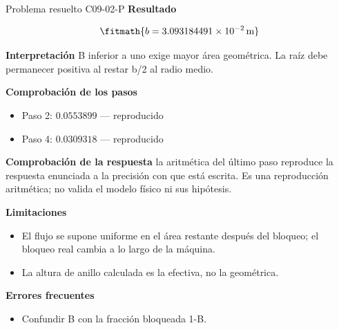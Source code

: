 \documentclass[10pt,openany]{book}
\begin{document}
\begin{studiumworked}{Problema resuelto C09-02-P}
\noindent\textbf{Resultado}

\[
\fitmath{b=3.093184491\times10^{-2}\,\mathrm{m}}
\]

\noindent\textbf{Interpretación}
B inferior a uno exige mayor área geométrica. La raíz debe permanecer positiva al restar b/2 al radio medio.

\noindent\textbf{Comprobación de los pasos}
\begin{itemize}
\item Paso 2: $0.0553899$ — reproducido
\item Paso 4: $0.0309318$ — reproducido
\end{itemize}

\noindent\textbf{Comprobación de la respuesta} la aritmética del último paso reproduce la respuesta enunciada a la precisión con que está escrita. Es una reproducción aritmética; no valida el modelo físico ni sus hipótesis.

\noindent\textbf{Limitaciones}
\begin{itemize}
\item El flujo se supone uniforme en el área restante después del bloqueo; el bloqueo real cambia a lo largo de la máquina.
\item La altura de anillo calculada es la efectiva, no la geométrica.
\end{itemize}

\noindent\textbf{Errores frecuentes}
\begin{itemize}
\item Confundir B con la fracción bloqueada 1-B.
\end{itemize}
\end{studiumworked}
\end{document}

